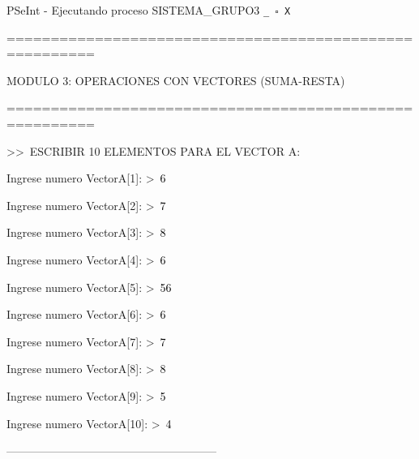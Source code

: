 \documentclass[12pt,a4paper]{article}
\newcommand{\consola}[1]{\noindent\textcolor{pseString}{#1}}
\newcommand{\entrada}[1]{\textcolor{black}{#1}}
\newenvironment{PSeIntWindow}{%
	\begin{tcolorbox}[
		breakable,
		enhanced,
		colback=white,
		colframe=black!60,
		boxrule=0.5pt,
		arc=1mm,
		left=0mm,
		right=0mm,
		top=0mm,
		bottom=2mm,
		width=\textwidth
		]
	}{%
	\end{tcolorbox}
}
\newcommand{\BarraPSeInt}{%
	\colorbox{gray!20}{%
		\parbox{\dimexpr\textwidth-2\fboxsep\relax}{%
			\small
			\textcolor{pseString}{\faPlayCircle}
			\hspace{0.3em}
			PSeInt - Ejecutando proceso SISTEMA\_GRUPO3
			\hfill
			\texttt{\_ \hspace{0.5em} \(\square\) \hspace{0.5em} X}
		}
	}
}
\begin{document}
\begin{PSeIntWindow}
	
	\BarraPSeInt
	
	\vspace{0.2cm}
	
	\ttfamily
	\small
	
	\consola{========================================================}\par
	
	\begin{center}
		\textcolor{pseString}{MODULO 3: OPERACIONES CON VECTORES (SUMA-RESTA)}
	\end{center}
	
	\consola{========================================================}\par
	
	\vspace{0.2cm}
	
	\consola{\textgreater\textgreater\ ESCRIBIR 10 ELEMENTOS PARA EL VECTOR A:}\par
	
	\vspace{0.15cm}
	
	\consola{Ingrese numero VectorA[1]: \textgreater\ }\entrada{6}\par
	\consola{Ingrese numero VectorA[2]: \textgreater\ }\entrada{7}\par
	\consola{Ingrese numero VectorA[3]: \textgreater\ }\entrada{8}\par
	\consola{Ingrese numero VectorA[4]: \textgreater\ }\entrada{6}\par
	\consola{Ingrese numero VectorA[5]: \textgreater\ }\entrada{56}\par
	\consola{Ingrese numero VectorA[6]: \textgreater\ }\entrada{6}\par
	\consola{Ingrese numero VectorA[7]: \textgreater\ }\entrada{7}\par
	\consola{Ingrese numero VectorA[8]: \textgreater\ }\entrada{8}\par
	\consola{Ingrese numero VectorA[9]: \textgreater\ }\entrada{5}\par
	\consola{Ingrese numero VectorA[10]: \textgreater\ }\entrada{4}\par
	
	\vspace{0.2cm}
	
	\consola{--------------------------------------------------------}\par
	
	\vspace{0.2cm}
	

\end{PSeIntWindow}
\end{document}
